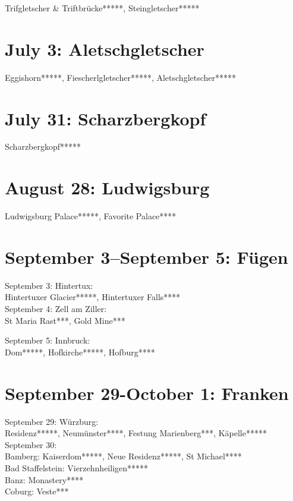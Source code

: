 Trifgletscher \& Triftbr\"ucke*****, Steingletscher*****

\section{July 3: Aletschgletscher}
\label{Aletsch2011}

Eggishorn*****, Fiescherlgletscher*****, Aletschgletscher*****

\section{July 31: Scharzbergkopf}
\label{Saasalmagell2011}

Scharzbergkopf*****

\section{August 28: Ludwigsburg}
\label{Ludwigsburg2011}

Ludwigsburg Palace*****, Favorite Palace****

\section{September 3--September 5: F\"ugen}
\label{Tirol2011}

September 3: Hintertux:\\
Hintertuxer Glacier*****, Hintertuxer Falls****\\

September 4: Zell am Ziller:\\
St Maria Rast***, Gold Mine***

September 5: Innbruck:\\
Dom*****, Hofkirche*****, Hofburg****

\section{September 29-October 1: Franken}
\label{Franken2011}

September 29: W\"urzburg:\\
Residenz*****, Neum\"unster****, Festung Marienberg***, K\"apelle*****\\

September 30:\\
Bamberg: Kaiserdom*****, Neue Residenz*****, St Michael****\\
Bad Staffelstein: Vierzehnheiligen*****\\
Banz: Monastery****\\
Coburg: Veste***\\

